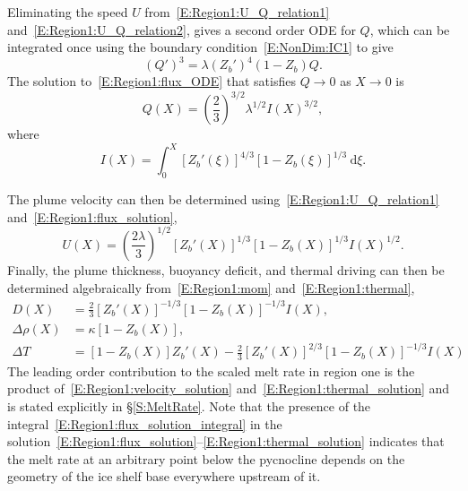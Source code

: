 \documentclass[openacc]{rsproca_new}%
\begin{document}
Eliminating the speed $U$ from~\eqref{E:Region1:U_Q_relation1} and~\eqref{E:Region1:U_Q_relation2}, gives a second order ODE for $Q$, which can be integrated once using the boundary condition~\eqref{E:NonDim:IC1} to give
\begin{equation}\label{E:Region1:flux_ODE}
(Q')^3 = \lambda\left(Z_b'\right)^4 \left(1-Z_b\right)Q.
\end{equation}
The solution to~\eqref{E:Region1:flux_ODE} that satisfies $Q \to 0$ as $X \to 0$ is
\begin{equation}\label{E:Region1:flux_solution}
Q(X) =  \left(\frac{2}{3}\right)^{3/2} \lambda^{1/2}I(X)^{3/2},
\end{equation}
where 
\begin{equation}\label{E:Region1:flux_solution_integral}
I(X) =  \int_0^X \left[Z_b'(\xi)\right]^{4/3}\left[1 - Z_b(\xi)\right]^{1/3}~\mathrm{d}\xi.
\end{equation}

The plume velocity can then be determined using~\eqref{E:Region1:U_Q_relation1} and~\eqref{E:Region1:flux_solution},
\begin{equation}\label{E:Region1:velocity_solution}
U(X) =\left(\frac{2\lambda}{3}\right)^{1/2}\left[Z_b'(X)\right]^{1/3}\left[1 - Z_b(X)\right]^{1/3}I(X)^{1/2}.
\end{equation}
Finally, the plume thickness, buoyancy deficit, and thermal driving can then be determined algebraically from~\eqref{E:Region1:mom} and~\eqref{E:Region1:thermal},
\begin{align}
D(X) &= \frac{2}{3}\left[Z_b'(X)\right]^{-1/3}\left[1 - Z_b(X)\right]^{-1/3}I(X),\label{E:Region1:thickness_solution}\\
\Delta \rho(X) &= \kappa \left[ 1- Z_b(X)\right],\label{E:Region1:buoyancy_solution}\\
\Delta T &= \left[1-Z_b(X)\right]Z_b'(X) - \frac{2}{3}\left[Z_b'(X)\right]^{2/3} \left[1-Z_b(X)\right]^{-1/3}I(X) \label{E:Region1:thermal_solution}
\end{align}
The leading order contribution to the scaled melt rate in region one is the product of~\eqref{E:Region1:velocity_solution} and~\eqref{E:Region1:thermal_solution} and is stated explicitly in \S\ref{S:MeltRate}. Note that the presence of the integral~\eqref{E:Region1:flux_solution_integral}  in the solution~\eqref{E:Region1:flux_solution}--\eqref{E:Region1:thermal_solution} indicates that the melt rate at an arbitrary point below the pycnocline depends on the geometry of the ice shelf base everywhere upstream of it.
\end{document}
